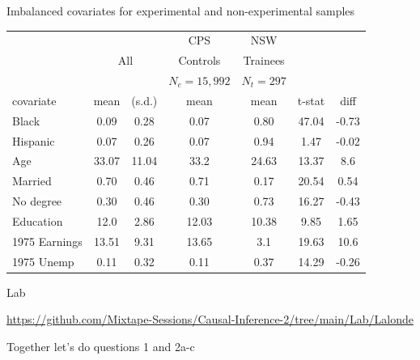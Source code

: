 \documentclass{beamer}
\begin{document}
\begin{frame}[plain,shrink=10]{Imbalanced covariates for experimental and non-experimental samples}

    \begin{center}
		\begin{table}
		\begin{tabular}{lcccccc}
		\hline \hline
		\multicolumn{3}{c}{}&
		\multicolumn{1}{c}{CPS}&
		\multicolumn{1}{c}{NSW}\\
		
		\multicolumn{1}{c}{}&
		\multicolumn{2}{c}{All} &
		\multicolumn{1}{c}{Controls} &
		\multicolumn{1}{c}{Trainees} \\

		\multicolumn{3}{c}{}&
		\multicolumn{1}{c}{$N_c=15,992$}&
		\multicolumn{1}{c}{$N_t=297$}&
		\multicolumn{1}{c}{}&
		\multicolumn{1}{c}{}\\

		\multicolumn{1}{l}{covariate}&
		\multicolumn{1}{c}{mean}&
		\multicolumn{1}{c}{(s.d.)}&
		\multicolumn{1}{c}{mean}&
		\multicolumn{1}{c}{mean}&
		\multicolumn{1}{c}{t-stat}&
		\multicolumn{1}{c}{diff}\\
		\hline
Black    & 0.09 & 0.28 & 0.07 & 0.80 & 47.04 & -0.73\\
Hispanic & 0.07 & 0.26 & 0.07 & 0.94 & 1.47 & -0.02\\
Age & 33.07 & 11.04 & 33.2 & 24.63 & 13.37  & 8.6\\
Married & 0.70 & 0.46 & 0.71 & 0.17 & 20.54 & 0.54\\
No degree & 0.30 & 0.46 & 0.30 & 0.73 & 16.27 & -0.43\\
Education & 12.0 & 2.86 & 12.03 & 10.38 & 9.85 & 1.65 \\
1975 Earnings   & 13.51 & 9.31 & 13.65 & 3.1 & 19.63 & 10.6\\
1975 Unemp  & 0.11 & 0.32 & 0.11 & 0.37 & 14.29 & -0.26\\
		\hline 
		\end{tabular}
		\end{table}
    \end{center}

\end{frame}


\begin{frame}{Lab}

\url{https://github.com/Mixtape-Sessions/Causal-Inference-2/tree/main/Lab/Lalonde}

\bigskip

Together let's do questions 1 and 2a-c

\end{frame}
\end{document}
